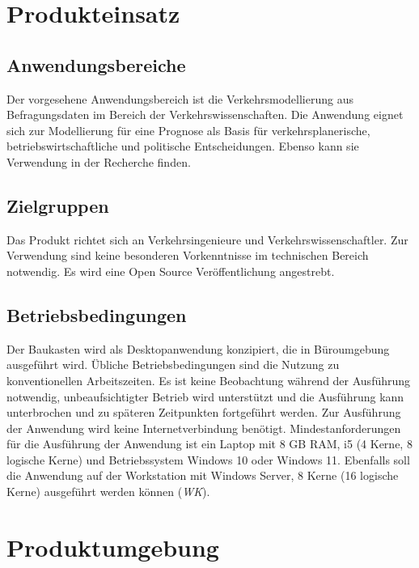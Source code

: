 \documentclass{article}
\begin{document}

\clearpage
\section{Produkteinsatz}
\subsection{Anwendungsbereiche}
Der vorgesehene Anwendungsbereich ist die Verkehrsmodellierung aus Befragungsdaten im Bereich der Verkehrswissenschaften. Die Anwendung eignet sich zur Modellierung für eine Prognose als Basis für verkehrsplanerische, betriebswirtschaftliche und politische Entscheidungen. Ebenso kann sie Verwendung in der Recherche finden.

\subsection{Zielgruppen}
Das Produkt richtet sich an Verkehrsingenieure und Verkehrswissenschaftler. Zur Verwendung sind keine besonderen Vorkenntnisse im technischen Bereich notwendig.\newline 
Es wird eine Open Source Veröffentlichung angestrebt.
  
\subsection{Betriebsbedingungen}
Der Baukasten wird als Desktopanwendung konzipiert, die in Büroumgebung ausgeführt wird. Übliche Betriebsbedingungen sind die Nutzung zu konventionellen Arbeitszeiten. Es ist keine Beobachtung während der Ausführung notwendig, unbeaufsichtigter Betrieb wird unterstützt und die Ausführung kann unterbrochen und zu späteren Zeitpunkten fortgeführt werden. Zur Ausführung der Anwendung wird keine Internetverbindung benötigt.
Mindestanforderungen für die Ausführung der Anwendung ist ein Laptop mit 8 GB RAM, i5 (4 Kerne, 8 logische Kerne) und Betriebssystem Windows 10 oder Windows 11. Ebenfalls soll die Anwendung auf der Workstation mit Windows Server, 8 Kerne (16 logische Kerne) ausgeführt werden können (\textit{WK}).

\clearpage
\section{Produktumgebung}
\end{document}
